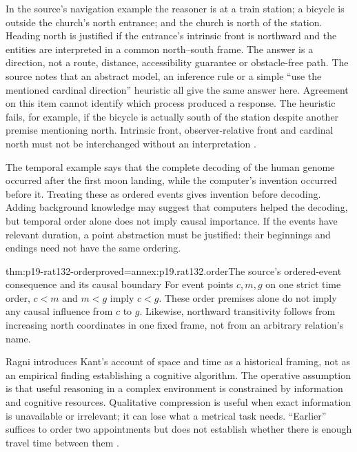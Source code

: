 In the source's navigation example the reasoner is at a train station; a
bicycle is outside the church's north entrance; and the church is north of
the station. Heading north is justified if the entrance's intrinsic front
is northward and the entities are interpreted in a common north--south
frame. The answer is a direction, not a route, distance, accessibility
guarantee or obstacle-free path. The source notes that an abstract model,
an inference rule or a simple ``use the mentioned cardinal direction''
heuristic all give the same answer here. Agreement on this item cannot
identify which process produced a response. The heuristic fails, for
example, if the bicycle is actually south of the station despite another
premise mentioning north. Intrinsic front, observer-relative front and
cardinal north must not be interchanged without an interpretation
\cite[pp.~725--726]{Ragni2021SpatialTemporal}.

The temporal example says that the complete decoding of the human genome
occurred after the first moon landing, while the computer's invention
occurred before it. Treating these as ordered events gives invention before
decoding. Adding background knowledge may suggest that computers helped the
decoding, but temporal order alone does not imply causal importance. If the
events have relevant duration, a point abstraction must be justified: their
beginnings and endings need not have the same ordering.

\begin{hbtheorem}{thm:p19-rat132-order}{proved=annex:p19.rat132.order}{The source's ordered-event consequence and its causal boundary}
For event points \(c,m,g\) on one strict time order,
\(c<m\) and \(m<g\) imply \(c<g\). These order premises
alone do not imply any causal influence from \(c\) to \(g\).
Likewise, northward transitivity follows from increasing north coordinates
in one fixed frame, not from an arbitrary relation's name.
\end{hbtheorem}

Ragni introduces Kant's account of space and time as a historical framing,
not as an empirical finding establishing a cognitive algorithm. The operative
assumption is that useful reasoning in a complex environment is constrained
by information and cognitive resources. Qualitative compression is useful
when exact information is unavailable or irrelevant; it can lose what a
metrical task needs. ``Earlier'' suffices to order two appointments but does
not establish whether there is enough travel time between them
\cite[secs.~1,7]{Ragni2021SpatialTemporal}.

